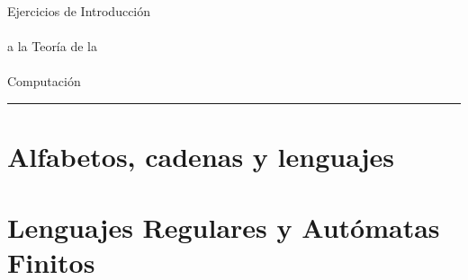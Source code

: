 \documentclass[12pt,a4paper]{report}
\begin{document}
\begin{titlepage}
\vspace*{5cm}

\noindent
\titlefont Ejercicios de Introducción\\\\ 
a la Teoría de la\\\\
\vspace*{0.7cm}Computación \par
\vspace*{8cm}
\noindent
\hfill
\begin{minipage}{0.45\linewidth}
    \begin{flushright}
        \printauthor
    \end{flushright}
\end{minipage}
%
\begin{minipage}{0.02\linewidth}
    \rule{1pt}{120pt}
\end{minipage}
\titlepagedecoration
\end{titlepage}

\tableofcontents
\cleardoublepage

\chapter{Alfabetos, cadenas y lenguajes}

\chapter{Lenguajes Regulares y Autómatas Finitos}

\end{document}
